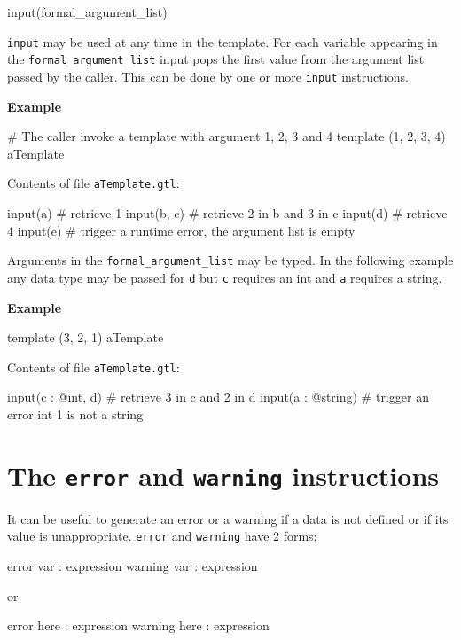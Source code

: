 \documentclass[10pt,openright,twosides,final]{memoir}
\newcommand{\gtltype}[1]{{\small\ttfamily #1}}
\newcommand{\gtlinline}[1]{\colorbox{light-blue}{\lstinline[language=gtl]{#1}}}
\newcommand{\example}{\vspace{.75em}\noindent\textbf{Example}\vspace{0em}}
\begin{document}
\begin{gtl}
input(formal_argument_list)
\end{gtl}

\gtlinline{input} may be used at any time in the template. For each variable appearing in the \gtlinline{formal_argument_list} input pops the first value from the argument list passed by the caller. This can be done by one or more \gtlinline{input} instructions.

\example
\begin{gtl}
# The caller invoke a template with argument 1, 2, 3 and 4
template (1, 2, 3, 4) aTemplate
\end{gtl}
\noindent Contents of file \texttt{\small aTemplate.gtl}:
\begin{gtl}
input(a)    # retrieve 1
input(b, c) # retrieve 2 in b and 3 in c
input(d)    # retrieve 4
input(e)    # trigger a runtime error, the argument list is empty
\end{gtl}

Arguments in the \gtlinline{formal_argument_list} may be typed. In the following example any data type may be passed for \gtlinline{d} but \gtlinline{c} requires an \gtltype{int} and \gtlinline{a} requires a \gtltype{string}.

\example
\begin{gtl}
template (3, 2, 1) aTemplate
\end{gtl}
\noindent Contents of file \texttt{\small aTemplate.gtl}:
\begin{gtl}
input(c : @int, d) # retrieve 3 in c and 2 in d
input(a : @string) # trigger an error int 1 is not a string
\end{gtl}

\section{The \texttt{error} and \texttt{warning} instructions}
\label{sec:errorInstruction}
\label{sec:warningInstruction}

It can be useful to generate an error or a warning if a data is not defined or if its value is unappropriate.  \gtlinline{error} and \gtlinline{warning} have 2 forms:

\begin{gtl}
error var : expression
warning var : expression
\end{gtl}

\noindent or

\begin{gtl}
error here : expression
warning here : expression
\end{gtl}
\end{document}
